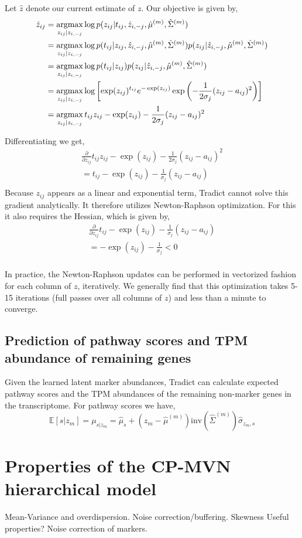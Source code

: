 \documentclass[10pt]{article}
\newcommand{\argmax}{\operatornamewithlimits{argmax}}
\begin{document}
Let $\hat{z}$ denote our current estimate of $z$. Our objective is given by,
\begin{align*}
\hat{z}_{ij} & = \argmax_{z_{ij} | z_{i,-j}} \log p(z_{ij} | t_{ij}, \hat{z}_{i,-j}, \hat{\mu}^{(m)}, \hat{\Sigma}^{(m)}) \\
& = \argmax_{z_{ij} | z_{i,-j} } \log p(t_{ij} | z_{ij}, \hat{z}_{i,-j}, \hat{\mu}^{(m)}, \hat{\Sigma}^{(m)})p(z_{ij} | \hat{z}_{i,-j}, \hat{\mu}^{(m)}, \hat{\Sigma}^{(m)})  \\
& = \argmax_{z_{ij} | z_{i,-j} } \log p(t_{ij} | z_{ij})p(z_{ij} | \hat{z}_{i,-j}, \hat{\mu}^{(m)}, \hat{\Sigma}^{(m)})  \\
& = \argmax_{z_{ij} | z_{i,-j} } \log \left[ \exp(z_{ij})^{t_{ij}}  e^{-\exp(z_{ij})} \exp \left( -\frac{1}{2\sigma_j}(z_{ij} - a_{ij})^2 \right) \right] \\
& = \argmax_{z_{ij} | z_{i,-j} }  t_{ij}z_{ij} -\exp(z_{ij})  -\frac{1}{2\sigma_j}(z_{ij} - a_{ij})^2 
\end{align*}

Differentiating we get,
\begin{align*}
\frac{\partial}{\partial z_{ij}}  t_{ij}z_{ij} -\exp(z_{ij})  -\frac{1}{2\sigma_j}(z_{ij} - a_{ij})^2 \\ 
= t_{ij} - \exp(z_{ij})  -\frac{1}{\sigma_j}(z_{ij} - a_{ij}) \\ 
\end{align*}
Because $z_{ij}$ appears as a linear and exponential term, Tradict cannot solve this gradient analytically. It therefore utilizes Newton-Raphson optimization. For this it also requires the Hessian, which is given by,  
\begin{align*}
\frac{\partial}{\partial z_{ij}} t_{ij} - \exp(z_{ij})  -\frac{1}{\sigma_j}(z_{ij} - a_{ij}) \\ 
=  -\exp(z_{ij})  - \frac{1}{\sigma_j} < 0\\ 
\end{align*}

In practice, the Newton-Raphson updates can be performed in vectorized fashion  for each column of $z$, iteratively. We generally find that this optimization takes 5-15 iterations (full passes over all columns of $z$) and less than a minute to converge.  

\subsection{Prediction of pathway scores and TPM abundance of remaining genes}

Given the learned latent marker abundances, Tradict can calculate expected pathway scores and the TPM abundances of the remaining non-marker genes in the transcriptome. For pathway scores we have, 
\[
\mathbb{E}[s|z_m] = \mu_{s|z_m} = \hat{\mu}_s + \left(z_m - \hat{\mu}^{(m)} \right)\textrm{inv}\left( \hat{\Sigma}^{(m)} \right)\hat{\sigma}_{z_{m},s}
\]


\section{Properties of the CP-MVN hierarchical model}
Mean-Variance and overdispersion. Noise correction/buffering. Skewness
Useful properties? Noise correction of markers.
\end{document}
